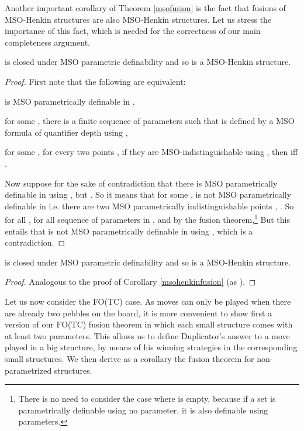 \documentclass{LMCS}
\newcommand{\mso}{\textsf{MSO}\xspace}
\newcommand{\fotc}{\textsf{FO(TC)}\xspace}
\begin{document}
Another important corollary of Theorem \ref{msofusion} is the fact that fusions of \mso-Henkin structures are also \mso-Henkin structures.
Let us stress the importance of this fact, which is needed for the correctness of our main completeness argument.

\begin{cor}
 is closed
under \mso parametric definability and so  is a \mso-Henkin
structure.\label{msohenkinfusion}
\end{cor}

\begin{proof}
First note that the following are equivalent:
\begin{iteMize}{}
\item    is \mso parametrically definable in ,
\item   for some , there is a finite sequence of parameters  such that
 is defined by a \mso formula  of quantifier depth 
using ,
\item  for some , for every two points , if they are \mso -indistinguishable using
, then  iff .
\end{iteMize}
Now suppose for the sake of contradiction that there is  \mso parametrically definable in
 using , but . So
it means that for some , 
is not \mso parametrically definable in  i.e. there are
two \mso parametrically indistinguishable points , . So for all , for all sequence of parameters
 in ,  and by the fusion theorem,\footnote{There is no need to consider the case where
 is empty, because if a set is parametrically
definable using no parameter, it is also definable using
parameters.}  But this entails that 
is not \mso parametrically definable in
 using , which is a contradiction.
\end{proof}

\begin{cor}
 is closed
under \mso parametric definability and so  is a \mso-Henkin
structure.\label{msohenkinunion}
\end{cor}
\begin{proof}
Analogous to the proof of Corollary \ref{msohenkinfusion} (as
).
\end{proof}


Let us now consider the \fotc case. As  moves can only be played when there are already two pebbles on the board, it is more convenient to show first a version of our \fotc fusion theorem in which each small structure comes with at least two parameters. This allows us to define Duplicator's answer to a  move played in a big structure, by means of his winning strategies in the corresponding small structures. We then derive as a corollary the fusion theorem for non-parametrized structures.
\end{document}
